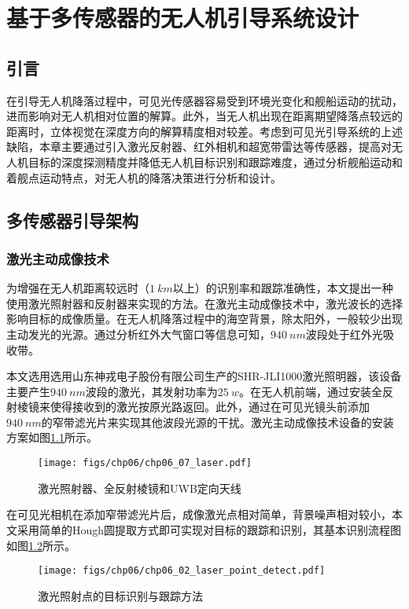 \chapter{基于多传感器的无人机引导系统设计}
\section{引言}
在引导无人机降落过程中，可见光传感器容易受到环境光变化和舰船运动的扰动，进而影响对无人机相对位置的解算。此外，当无人机出现在距离期望降落点较远的距离时，立体视觉在深度方向的解算精度相对较差。考虑到可见光引导系统的上述缺陷，本章主要通过引入激光反射器、红外相机和超宽带雷达等传感器，提高对无人机目标的深度探测精度并降低无人机目标识别和跟踪难度，通过分析舰船运动和着舰点运动特点，对无人机的降落决策进行分析和设计。

\section{多传感器引导架构}
\subsection{激光主动成像技术}
为增强在无人机距离较远时（$1\ km$以上）的识别率和跟踪准确性，本文提出一种使用激光照射器和反射器来实现的方法。在激光主动成像技术中，激光波长的选择影响目标的成像质量。在无人机降落过程中的海空背景，除太阳外，一般较少出现主动发光的光源。通过分析红外大气窗口等信息可知，$940\ nm$波段处于红外光吸收带。

本文选用选用山东神戎电子股份有限公司生产的SHR-JLI1000激光照明器，该设备主要产生$940\ nm$波段的激光，其发射功率为$25\ w$。在无人机前端，通过安装全反射棱镜来使得接收到的激光按原光路返回。此外，通过在可见光镜头前添加$940\ nm$的窄带滤光片来实现其他波段光源的干扰。激光主动成像技术设备的安装方案如图\ref{fig:chp06_07_laser}所示。

\begin{figure}[!h]
	\centering
	\texttt{[image: figs/chp06/chp06\_07\_laser.pdf]}	
	\caption{激光照射器、全反射棱镜和UWB定向天线}
	\label{fig:chp06_07_laser}
\end{figure}

在可见光相机在添加窄带滤光片后，成像激光点相对简单，背景噪声相对较小，本文采用简单的Hough圆提取方式即可实现对目标的跟踪和识别，其基本识别流程图如图\ref{fig:chp06_02_laser_point_detect}所示。

\begin{figure}[!t]
	\centering
	\texttt{[image: figs/chp06/chp06\_02\_laser\_point\_detect.pdf]}	
	\caption{激光照射点的目标识别与跟踪方法}
	\label{fig:chp06_02_laser_point_detect}
\end{figure}

